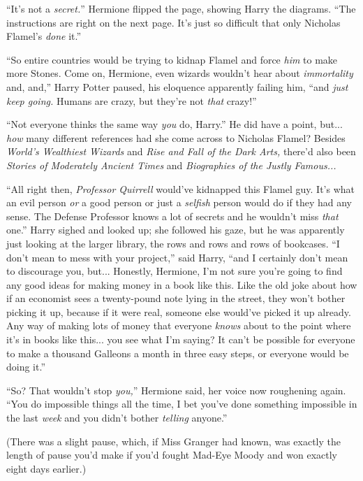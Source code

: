 ``It's not a \emph{secret.}'' Hermione flipped the page, showing Harry the diagrams. ``The instructions are right on the next page. It's just so difficult that only Nicholas Flamel's \emph{done} it.''

``So entire countries would be trying to kidnap Flamel and force \emph{him} to make more Stones. Come on, Hermione, even wizards wouldn't hear about \emph{immortality} and, and,'' Harry Potter paused, his eloquence apparently failing him, ``and \emph{just keep going.} Humans are crazy, but they're not \emph{that} crazy!''

``Not everyone thinks the same way \emph{you} do, Harry.'' He did have a point, but... \emph{how} many different references had she come across to Nicholas Flamel? Besides \emph{World's Wealthiest Wizards} and \emph{Rise and Fall of the Dark Arts,} there'd also been \emph{Stories of Moderately Ancient Times} and \emph{Biographies of the Justly Famous...}

``All right then, \emph{Professor Quirrell} would've kidnapped this Flamel guy. It's what an evil person \emph{or} a good person or just a \emph{selfish} person would do if they had any sense. The Defense Professor knows a lot of secrets and he wouldn't miss \emph{that} one.'' Harry sighed and looked up; she followed his gaze, but he was apparently just looking at the larger library, the rows and rows and rows of bookcases. ``I don't mean to mess with your project,'' said Harry, ``and I certainly don't mean to discourage you, but... Honestly, Hermione, I'm not sure you're going to find any good ideas for making money in a book like this. Like the old joke about how if an economist sees a twenty-pound note lying in the street, they won't bother picking it up, because if it were real, someone else would've picked it up already. Any way of making lots of money that everyone \emph{knows} about to the point where it's in books like this... you see what I'm saying? It can't be possible for everyone to make a thousand Galleons a month in three easy steps, or everyone would be doing it.''

``So? That wouldn't stop \emph{you,}'' Hermione said, her voice now roughening again. ``You do impossible things all the time, I bet you've done something impossible in the last \emph{week} and you didn't bother \emph{telling} anyone.''

(There was a slight pause, which, if Miss Granger had known, was exactly the length of pause you'd make if you'd fought Mad-Eye Moody and won exactly eight days earlier.)

